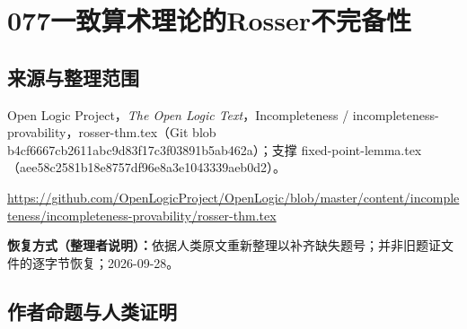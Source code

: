 \documentclass[UTF8,11pt]{ctexart}
\theoremstyle{definition}
\begin{document}
\section*{077\quad 一致算术理论的Rosser不完备性}
\subsection*{来源与整理范围}
Open Logic Project，\emph{The Open Logic Text}，Incompleteness / incompleteness-provability，rosser-thm.tex（Git blob b4cf6667cb2611abc9d83f17c3f03891b5ab462a）；支撑 fixed-point-lemma.tex（aee58c2581b18e8757df96e8a3e1043339aeb0d2）。
\par\url{https://github.com/OpenLogicProject/OpenLogic/blob/master/content/incompleteness/incompleteness-provability/rosser-thm.tex}
\par\textbf{恢复方式（整理者说明）：}依据人类原文重新整理以补齐缺失题号；并非旧题证文件的逐字节恢复；2026-09-28。
\subsection*{作者命题与人类证明}
\end{document}
